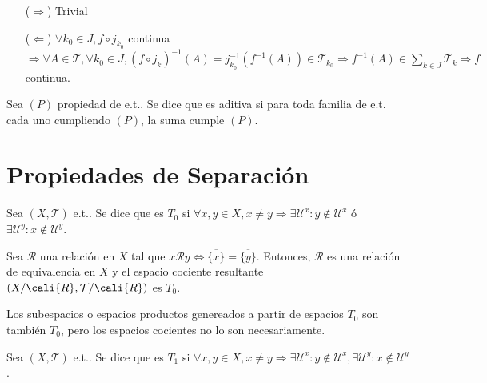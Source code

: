 \begin{dem}
  \begin{enumerate}[label=(\roman*)]
    \item [($\Rightarrow$)] Trivial
    \item [($\Leftarrow$)] $\forall k_{0} \in J, f \circ j_{k_{0}}$ continua $\Rightarrow \forall A \in \mathcal{T}, \forall k_{0} \in J, (f \circ j_{k})^{-1}(A) = j_{k_{0}}^{-1}(f^{-1}(A)) \in \mathcal{T}_{k_{0}} \Rightarrow f^{-1}(A) \in \sum_{ k \in J } \mathcal{T}_{k} \Rightarrow f$ continua.
  \end{enumerate}
\end{dem}

\begin{defn}
  Sea $(P)$ propiedad de e.t.. Se dice que es aditiva si para toda familia de e.t. cada uno cumpliendo $(P)$, la suma cumple $(P)$.
\end{defn}

\chapter{Propiedades de Separación}

\begin{defn}
  Sea $( X, \mathcal{T} )$ e.t.. Se dice que es $T_{0}$ si $\forall x, y \in X, x \neq y \Rightarrow \exists \mathcal{U}^{x} : y \not \in \mathcal{U}^{x} $ ó $ \exists \mathcal{U}^{y} : x \not \in \mathcal{U}^{y}$.
\end{defn}

\begin{ejm}
  Sea $\mathcal{R}$ una relación en $X$ tal que $x \mathcal{R} y \Leftrightarrow \overline{\{ x \}} = \overline{\{ y \}}$. Entonces, $\mathcal{R}$ es una relación de equivalencia en $X$ y el espacio cociente resultante $( X/\cali{R}, \mathcal{T}/\cali{R} )$ es $T_{0}$.
\end{ejm}

\begin{obs}
  Los subespacios o espacios productos genereados a partir de espacios $T_{0}$ son también $T_{0}$, pero los espacios cocientes no lo son necesariamente.
\end{obs}

\begin{defn}
  Sea $( X, \mathcal{T} )$ e.t.. Se dice que es $T_{1}$ si $ \forall x, y \in X, x \neq y \Rightarrow \exists \mathcal{U}^{x}: y \not \in \mathcal{U}^{x}, \exists \mathcal{U}^{y}: x \not \in \mathcal{U}^{y}$.
\end{defn}


